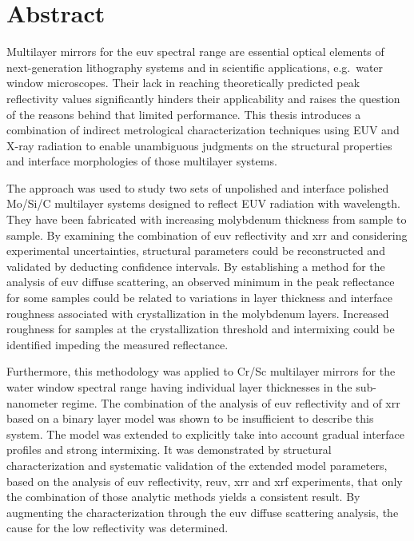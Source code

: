 \section*{Abstract}

\thispagestyle{empty}

    Multilayer mirrors for the \gls{euv} spectral range are essential optical elements of next-generation lithography systems and in scientific applications, e.g.~water window microscopes. Their lack in reaching theoretically predicted peak reflectivity values significantly hinders their applicability and raises the question of the reasons behind that limited performance. This thesis introduces a combination of indirect metrological characterization techniques using EUV and X-ray radiation to enable unambiguous judgments on the structural properties and interface morphologies of those multilayer systems.
    
    The approach was used to study two sets of unpolished and interface polished Mo/Si/C multilayer systems designed to reflect EUV radiation with  wavelength. They have been fabricated with increasing molybdenum thickness from sample to sample. By examining the combination of \gls{euv} reflectivity and \gls{xrr} and considering experimental uncertainties, structural parameters could be reconstructed and validated by deducting confidence intervals. By establishing a method for the analysis of \gls{euv} diffuse scattering, an observed minimum in the peak reflectance for some samples could be related to variations in layer thickness and interface roughness associated with crystallization in the molybdenum layers. Increased roughness for samples at the crystallization threshold and intermixing could be identified impeding the measured reflectance.
    
    Furthermore, this methodology was applied to Cr/Sc multilayer mirrors for the water window spectral range having individual layer thicknesses in the sub-nanometer regime. The combination of the analysis of \gls{euv} reflectivity and of \gls{xrr} based on a binary layer model was shown to be insufficient to describe this system. The model was extended to explicitly take into account gradual interface profiles and strong intermixing. It was demonstrated by structural characterization and systematic validation of the extended model parameters, based on the analysis of \gls{euv} reflectivity, \gls{reuv}, \gls{xrr} and \gls{xrf} experiments, that only the combination of those analytic methods yields a consistent result. By augmenting the characterization through the \gls{euv} diffuse scattering analysis, the cause for the low reflectivity was determined.

